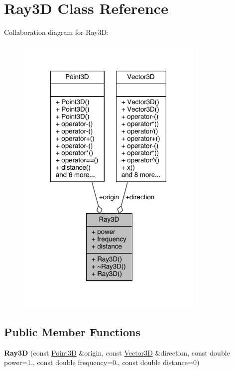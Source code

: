 \hypertarget{class_ray3_d}{}\section{Ray3D Class Reference}
\label{class_ray3_d}


Collaboration diagram for Ray3D\+:
\nopagebreak
\begin{figure}[H]
\begin{center}
\leavevmode
\includegraphics[width=254pt]{doxygen/latex/class_ray3_d__coll__graph}
\end{center}
\end{figure}
\subsection*{Public Member Functions}
\begin{DoxyCompactItemize}
\item 
\hypertarget{class_ray3_d_a0cd2092288763fc6c0fd8dccebf11527}{}\label{class_ray3_d_a0cd2092288763fc6c0fd8dccebf11527} 
{\bfseries Ray3D} (const \hyperlink{class_point3_d}{Point3D} \&origin, const \hyperlink{class_vector3_d}{Vector3D} \&direction, const double power=1., const double frequency=0., const double distance=0)
\end{DoxyCompactItemize}
